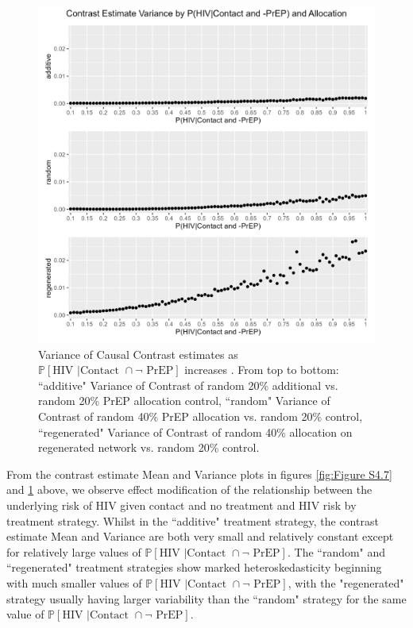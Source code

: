 \documentclass{article}
\theoremstyle{definition}
\begin{document}
\begin{figure}[H]
    \centering
    \includegraphics[width=\linewidth]{Figures/p1 Variance plots.png}
    \caption{Variance of Causal Contrast estimates as $\mathbb{P}\left[\text{HIV } \vert \text {Contact } \cap \neg \text{ PrEP}\right]$ increases .  From top to bottom: ``additive" Variance of Contrast of random 20\% additional vs. random 20\% PrEP allocation control, ``random" Variance of Contrast of random 40\% PrEP allocation vs. random 20\% control, ``regenerated" Variance of Contrast of random 40\% allocation on regenerated network vs. random 20\% control.}
    \label{fig:Figure S4.8}
\end{figure}
From the contrast estimate Mean and Variance plots in figures \ref{fig:Figure S4.7} and \ref{fig:Figure S4.8} above, we observe effect modification of the relationship between the underlying risk of HIV given contact and no treatment and HIV risk by treatment strategy. Whilst in the ``additive" treatment strategy, the contrast estimate Mean and Variance are both very small and relatively constant except for relatively large values of $\mathbb{P}\left[\text{HIV } \vert \text {Contact } \cap \neg \text{ PrEP}\right]$. The ``random" and ``regenerated" treatment strategies show marked heteroskedasticity beginning with much smaller values of $\mathbb{P}\left[\text{HIV } \vert \text {Contact } \cap \neg \text{ PrEP}\right]$, with the "regenerated" strategy usually having larger variability than the ``random" strategy for the same value of $\mathbb{P}\left[\text{HIV } \vert \text {Contact } \cap \neg \text{ PrEP}\right]$.  
\end{document}
